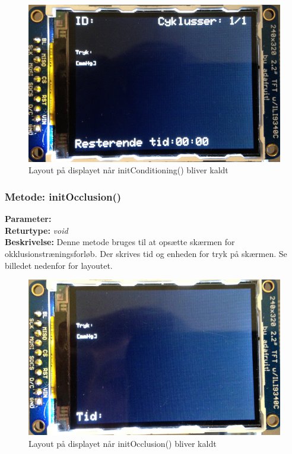 \begin{figure}[H]
	\includegraphics[width=\textwidth]{Implementeringsdokument/billeder/conditioning.png}
	\caption{Layout på displayet når initConditioning() bliver kaldt}\label{pic:conditiong}
\end{figure}

\subsubsection{Metode: initOcclusion()}
\textbf{Parameter: }
\\ \textbf{Returtype: } \textit{void}
\\ \textbf{Beskrivelse: }  Denne metode bruges til at opsætte skærmen for okklusionstræningsforløb. Der skrives tid og enheden for tryk på skærmen. Se billedet nedenfor for layoutet. 

\begin{figure}[H]
	\includegraphics[width=\textwidth]{Implementeringsdokument/billeder/occlusion.png}
	\caption{Layout på displayet når initOcclusion() bliver kaldt}\label{pic:occlusion}
\end{figure}

